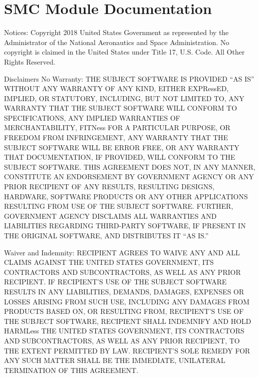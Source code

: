 \documentclass[letterpaper,10pt,english]{sphinxmanual}
\begin{document}
\section{SMC Module Documentation}
\label{\detokenize{source_code:module-smcpy.smc.smc_sampler}}\label{\detokenize{source_code:smc-module-documentation}}
Notices:
Copyright 2018 United States Government as represented by the Administrator of
the National Aeronautics and Space Administration. No copyright is claimed in
the United States under Title 17, U.S. Code. All Other Rights Reserved.

Disclaimers
No Warranty: THE SUBJECT SOFTWARE IS PROVIDED “AS IS” WITHOUT ANY WARRANTY OF
ANY KIND, EITHER EXPRessED, IMPLIED, OR STATUTORY, INCLUDING, BUT NOT LIMITED
TO, ANY WARRANTY THAT THE SUBJECT SOFTWARE WILL CONFORM TO SPECIFICATIONS, ANY
IMPLIED WARRANTIES OF MERCHANTABILITY, FITNess FOR A PARTICULAR PURPOSE, OR
FREEDOM FROM INFRINGEMENT, ANY WARRANTY THAT THE SUBJECT SOFTWARE WILL BE ERROR
FREE, OR ANY WARRANTY THAT DOCUMENTATION, IF PROVIDED, WILL CONFORM TO THE
SUBJECT SOFTWARE. THIS AGREEMENT DOES NOT, IN ANY MANNER, CONSTITUTE AN
ENDORSEMENT BY GOVERNMENT AGENCY OR ANY PRIOR RECIPIENT OF ANY RESULTS,
RESULTING DESIGNS, HARDWARE, SOFTWARE PRODUCTS OR ANY OTHER APPLICATIONS
RESULTING FROM USE OF THE SUBJECT SOFTWARE.  FURTHER, GOVERNMENT AGENCY
DISCLAIMS ALL WARRANTIES AND LIABILITIES REGARDING THIRD-PARTY SOFTWARE, IF
PRESENT IN THE ORIGINAL SOFTWARE, AND DISTRIBUTES IT “AS IS.”

Waiver and Indemnity:  RECIPIENT AGREES TO WAIVE ANY AND ALL CLAIMS AGAINST THE
UNITED STATES GOVERNMENT, ITS CONTRACTORS AND SUBCONTRACTORS, AS WELL AS ANY
PRIOR RECIPIENT.  IF RECIPIENT’S USE OF THE SUBJECT SOFTWARE RESULTS IN ANY
LIABILITIES, DEMANDS, DAMAGES, EXPENSES OR LOSSES ARISING FROM SUCH USE,
INCLUDING ANY DAMAGES FROM PRODUCTS BASED ON, OR RESULTING FROM, RECIPIENT’S
USE OF THE SUBJECT SOFTWARE, RECIPIENT SHALL INDEMNIFY AND HOLD HARMLess THE
UNITED STATES GOVERNMENT, ITS CONTRACTORS AND SUBCONTRACTORS, AS WELL AS ANY
PRIOR RECIPIENT, TO THE EXTENT PERMITTED BY LAW.  RECIPIENT’S SOLE REMEDY FOR
ANY SUCH MATTER SHALL BE THE IMMEDIATE, UNILATERAL TERMINATION OF THIS
AGREEMENT.
\end{document}
